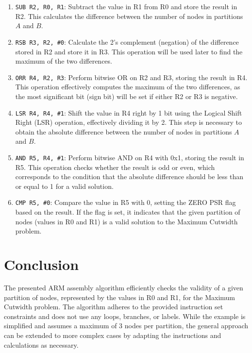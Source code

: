 \begin{enumerate}
    \item \texttt{SUB R2, R0, R1}: Subtract the value in R1 from R0 and store the result in R2. This calculates the difference between the number of nodes in partitions $A$ and $B$.
    
    \item \texttt{RSB R3, R2, \#0}: Calculate the 2's complement (negation) of the difference stored in R2 and store it in R3. This operation will be used later to find the maximum of the two differences.
    
    \item \texttt{ORR R4, R2, R3}: Perform bitwise OR on R2 and R3, storing the result in R4. This operation effectively computes the maximum of the two differences, as the most significant bit (sign bit) will be set if either R2 or R3 is negative.
    
    \item \texttt{LSR R4, R4, \#1}: Shift the value in R4 right by 1 bit using the Logical Shift Right (LSR) operation, effectively dividing it by 2. This step is necessary to obtain the absolute difference between the number of nodes in partitions $A$ and $B$.
    
    \item \texttt{AND R5, R4, \#1}: Perform bitwise AND on R4 with 0x1, storing the result in R5. This operation checks whether the result is odd or even, which corresponds to the condition that the absolute difference should be less than or equal to 1 for a valid solution.
    
    \item \texttt{CMP R5, \#0}: Compare the value in R5 with 0, setting the ZERO PSR flag based on the result. If the flag is set, it indicates that the given partition of nodes (values in R0 and R1) is a valid solution to the Maximum Cutwidth problem.
\end{enumerate}

\section{Conclusion}

The presented ARM assembly algorithm efficiently checks the validity of a given partition of nodes, represented by the values in R0 and R1, for the Maximum Cutwidth problem. The algorithm adheres to the provided instruction set constraints and does not use any loops, branches, or labels. While the example is simplified and assumes a maximum of 3 nodes per partition, the general approach can be extended to more complex cases by adapting the instructions and calculations as necessary.



